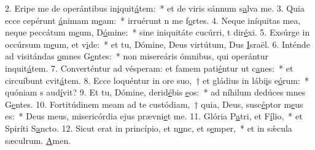2. Eripe me de operántibus in\uline{i}quit\uline{á}tem:~* et de viris sánnum s\uline{a}lva me.
3. Quia ecce cepérunt \uline{á}nimam m\uline{e}am:~* irruérunt n me f\uline{o}rtes.
4. Neque iníquitas mea, neque peccátum m\uline{e}um, D\uline{ó}mine:~* sine iniquitáte cucúrri, t dir\uline{é}xi.
5. Exsúrge in occúrsum m\uline{e}um, et v\uline{i}de:~* et tu, Dómine, Deus virtútum, Dus \uline{I}sraël.
6. Inténde ad visitándas \uline{o}mnes G\uline{e}ntes:~* non misereáris ómnibus, qui operántur inquit\uline{á}tem.
7. Converténtur ad vésperam: et famem pati\uline{é}ntur ut c\uline{a}nes:~* et circuíbunt cvit\uline{á}tem.
8. Ecce loquéntur in ore suo,~† et gládius in lábi\uline{i}s e\uline{ó}rum:~* quóniam s aud\uline{í}vit?
9. Et tu, Dómine, derid\uline{é}bis \uline{e}os:~* ad níhilum dedúces mnes G\uline{e}ntes.
10. Fortitúdinem meam ad te custódiam,~† quia, Deus, susc\uline{é}ptor m\uline{e}us es:~* Deus meus, misericórdia ejus prævni\uline{e}t me.
11. Glória P\uline{a}tri, et F\uline{í}lio,~* et Spiríti S\uline{a}ncto.
12. Sicut erat in princípio, et n\uline{u}nc, et s\uline{e}mper,~* et in sǽcula sæculrum. \uline{A}men.
